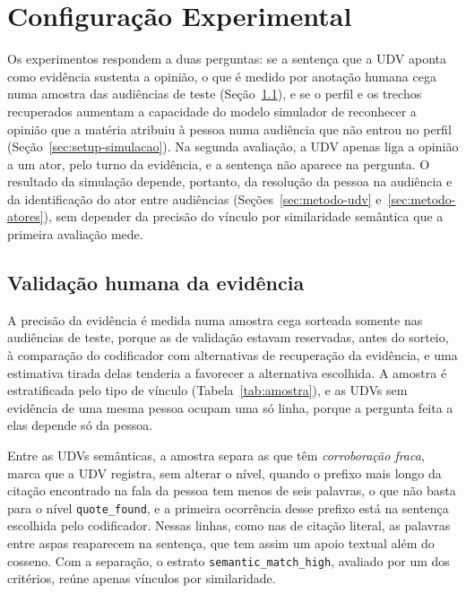 \section{Configura\c{c}\~ao Experimental}
\label{sec:setup}

Os experimentos respondem a duas perguntas: se a sentença que a UDV aponta como evidência sustenta a
opinião, o que é medido por anotação humana cega numa amostra das audiências de teste
(Seção~\ref{sec:setup-udv}), e se o perfil e os trechos recuperados aumentam a capacidade do modelo
simulador de reconhecer a opinião que a matéria atribuiu à pessoa numa audiência que não entrou no
perfil (Seção~\ref{sec:setup-simulacao}). Na segunda avaliação, a UDV apenas liga a opinião a um
ator, pelo turno da evidência, e a sentença não aparece na pergunta. O resultado da simulação depende,
portanto, da resolução da pessoa na audiência e da identificação do ator entre audiências
(Seções~\ref{sec:metodo-udv} e~\ref{sec:metodo-atores}), sem depender da precisão do vínculo por
similaridade semântica que a primeira avaliação mede.

\subsection{Validação humana da evidência}
\label{sec:setup-udv}



A precisão da evidência é medida numa amostra cega sorteada somente nas audiências de teste, porque as
de validação estavam reservadas, antes do sorteio, à comparação do codificador com alternativas de
recuperação da evidência, e uma estimativa tirada delas tenderia a favorecer a alternativa escolhida.
A amostra é estratificada pelo tipo de vínculo (Tabela~\ref{tab:amostra}), e as UDVs sem evidência
de uma mesma pessoa ocupam uma só linha, porque a pergunta feita a elas depende só da pessoa.

Entre as UDVs semânticas, a amostra separa as que têm \emph{corroboração fraca}, marca que a UDV
registra, sem alterar o nível, quando o prefixo mais longo da citação encontrado na fala da pessoa tem
menos de seis palavras, o que não basta para o nível \texttt{quote\_found}, e a primeira ocorrência
desse prefixo está na sentença escolhida pelo codificador. Nessas linhas, como nas de citação literal,
as palavras entre aspas reaparecem na sentença, que tem assim um apoio textual além do cosseno. Com a
separação, o estrato \texttt{semantic\_match\_high}, avaliado por um dos critérios, reúne apenas
vínculos por similaridade.

